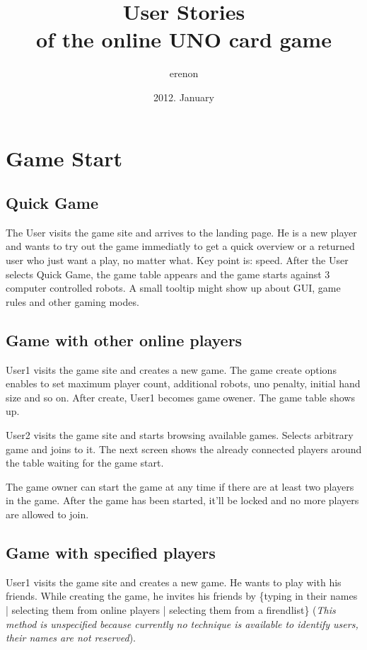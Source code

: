 \documentclass[a4paper,10pt]{article}
\title{User Stories \\ of the online UNO card game}
\author{erenon}
\date{2012. January}
\begin{document}
	\maketitle
	
	\tableofcontents

    \section{Game Start}

	\subsection{Quick Game}
The User visits the game site and arrives to the landing page. He is a new player and wants to try out the game immediatly to get a quick overview or a returned user who just want a play, no matter what. Key point is: speed.
After the User selects Quick Game, the game table appears and the game starts against 3 computer controlled robots. A small tooltip might show up about GUI, game rules and other gaming modes.

	\subsection{Game with other online players}
User1 visits the game site and creates a new game. The game create options enables to set maximum player count, additional robots, uno penalty, initial hand size and so on. After create, User1 becomes game owener. The game table shows up.

User2 visits the game site and starts browsing available games. Selects arbitrary game and joins to it. The next screen shows the already connected players around the table waiting for the game start.

The game owner can start the game at any time if there are at least two players in the game. After the game has been started, it'll be locked and no more players are allowed to join.
	
	\subsection{Game with specified players}
User1 visits the game site and creates a new game. He wants to play with his friends. While creating the game, he invites his friends by \{typing in their names | selecting them from online players | selecting them from a firendlist\} (\emph{This method is unspecified because currently no technique is available to identify users, their names are not reserved}).
\end{document}
